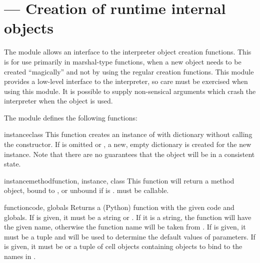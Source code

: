 \section{ ---
         Creation of runtime internal objects}



The  module allows an interface to the interpreter object
creation functions. This is for use primarily in marshal-type functions,
when a new object needs to be created ``magically'' and not by using the
regular creation functions. This module provides a low-level interface
to the interpreter, so care must be exercised when using this module.
It is possible to supply non-sensical arguments which crash the
interpreter when the object is used.

The  module defines the following functions:

\begin{funcdesc}{instance}{class}
This function creates an instance of  with dictionary
 without calling the  constructor.  If
 is omitted or , a new, empty dictionary is
created for the new instance.  Note that there are no guarantees that
the object will be in a consistent state.
\end{funcdesc}

\begin{funcdesc}{instancemethod}{function, instance, class}
This function will return a method object, bound to , or
unbound if  is .   must be
callable.
\end{funcdesc}

\begin{funcdesc}{function}{code, globals}
Returns a (Python) function with the given code and globals. If
 is given, it must be a string or .  If it is a
string, the function will have the given name, otherwise the function
name will be taken from .  If
 is given, it must be a tuple and will be used to
determine the default values of parameters.  If  is given,
it must be  or a tuple of cell objects containing objects
to bind to the names in .
\end{funcdesc}

